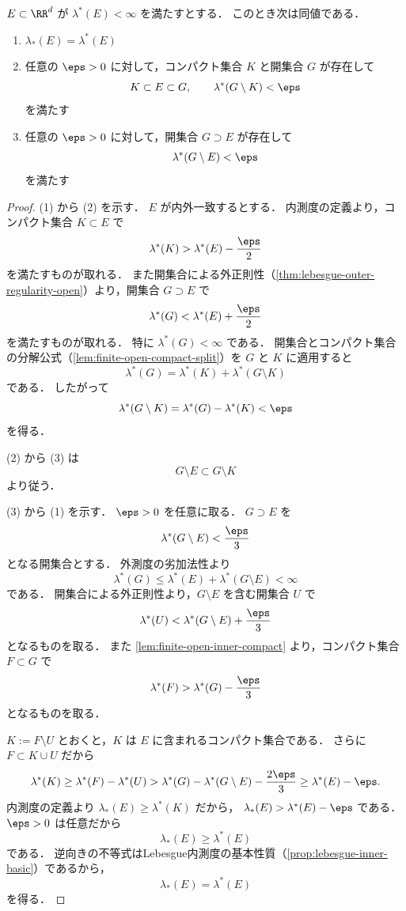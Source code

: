 \begin{lemma}[有限外測度集合の近似判定法]\label{lem:finite-outer-approx-criterion}
$E\subset\RR^d$ が $\lambda^*(E)<\infty$ を満たすとする．
このとき次は同値である．
\begin{enumerate}
    \item $\lambda_*(E)=\lambda^*(E)$
    \item 任意の $\eps>0$ に対して，コンパクト集合 $K$ と開集合 $G$ が存在して
    \[
    K\subset E\subset G,
    \qquad
    \lambda^*(G\setminus K)<\eps
    \]
    を満たす
    \item 任意の $\eps>0$ に対して，開集合 $G\supset E$ が存在して
    \[
    \lambda^*(G\setminus E)<\eps
    \]
    を満たす
\end{enumerate}
\end{lemma}
\begin{proof}
(1) から (2) を示す．
$E$ が内外一致するとする．
内測度の定義より，コンパクト集合 $K\subset E$ で
\[
\lambda^*(K)>\lambda^*(E)-\frac{\eps}{2}
\]
を満たすものが取れる．
また開集合による外正則性（\cref{thm:lebesgue-outer-regularity-open}）より，開集合 $G\supset E$ で
\[
\lambda^*(G)<\lambda^*(E)+\frac{\eps}{2}
\]
を満たすものが取れる．
特に $\lambda^*(G)<\infty$ である．
開集合とコンパクト集合の分解公式（\cref{lem:finite-open-compact-split}）を $G$ と $K$ に適用すると
\[
\lambda^*(G)=\lambda^*(K)+\lambda^*(G\setminus K)
\]
である．
したがって
\[
\lambda^*(G\setminus K)
=\lambda^*(G)-\lambda^*(K)
<\eps
\]
を得る．

(2) から (3) は
\[
G\setminus E\subset G\setminus K
\]
より従う．

(3) から (1) を示す．
$\eps>0$ を任意に取る．
$G\supset E$ を
\[
\lambda^*(G\setminus E)<\frac{\eps}{3}
\]
となる開集合とする．
外測度の劣加法性より
\[
\lambda^*(G)\le \lambda^*(E)+\lambda^*(G\setminus E)<\infty
\]
である．
開集合による外正則性より，$G\setminus E$ を含む開集合 $U$ で
\[
\lambda^*(U)<\lambda^*(G\setminus E)+\frac{\eps}{3}
\]
となるものを取る．
また \cref{lem:finite-open-inner-compact} より，コンパクト集合 $F\subset G$ で
\[
\lambda^*(F)>\lambda^*(G)-\frac{\eps}{3}
\]
となるものを取る．

$K:=F\setminus U$ とおくと，$K$ は $E$ に含まれるコンパクト集合である．
さらに $F\subset K\cup U$ だから
\[
\lambda^*(K)
\ge
\lambda^*(F)-\lambda^*(U)
>
\lambda^*(G)-\lambda^*(G\setminus E)-\frac{2\eps}{3}
\ge
\lambda^*(E)-\eps.
\]
内測度の定義より $\lambda_*(E)\ge\lambda^*(K)$ だから，
$\lambda_*(E)>\lambda^*(E)-\eps$ である．
$\eps>0$ は任意だから
\[
\lambda_*(E)\ge \lambda^*(E)
\]
である．
逆向きの不等式はLebesgue内測度の基本性質（\cref{prop:lebesgue-inner-basic}）であるから，
\[
\lambda_*(E)=\lambda^*(E)
\]
を得る．
\end{proof}

